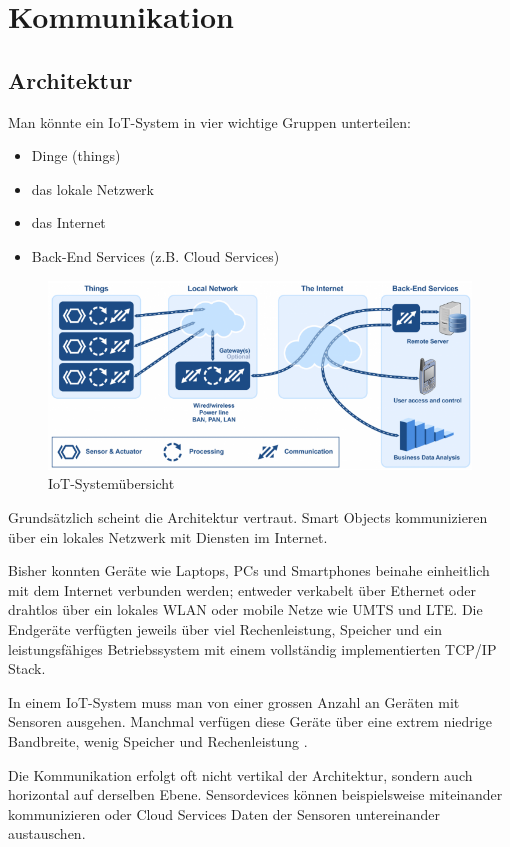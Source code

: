 \chapter{Kommunikation}
\section{Architektur}
Man könnte ein IoT-System in vier wichtige Gruppen unterteilen: \cite{IoTNetworks}
\begin{itemize}
\item Dinge (things)
\item das lokale Netzwerk
\item das Internet
\item Back-End Services (z.B. Cloud Services)
\end{itemize}
\begin{figure}[H]
\centering
\includegraphics[scale=0.8]{../02_Analyse/images/iot_system_overview_by_micrium.png}
\caption{IoT-Systemübersicht\cite{IoTOverview}}
\end{figure}
Grundsätzlich scheint die Architektur vertraut. Smart Objects kommunizieren über ein lokales Netzwerk mit Diensten im Internet.

Bisher konnten Geräte wie Laptops, PCs und Smartphones beinahe einheitlich mit dem Internet verbunden werden; entweder verkabelt über Ethernet oder drahtlos über ein lokales WLAN oder mobile Netze wie UMTS und LTE. Die Endgeräte verfügten jeweils über viel Rechenleistung, Speicher und ein leistungsfähiges Betriebssystem mit einem vollständig implementierten TCP/IP Stack. 

In einem IoT-System muss man von einer grossen Anzahl an Geräten mit Sensoren ausgehen. Manchmal verfügen diese Geräte über eine extrem niedrige Bandbreite, wenig Speicher und Rechenleistung \cite{CiscoIoTArchitecture}.

Die Kommunikation erfolgt oft nicht vertikal der Architektur, sondern auch horizontal auf derselben Ebene. Sensordevices können beispielsweise miteinander kommunizieren oder Cloud Services Daten der Sensoren untereinander austauschen.

